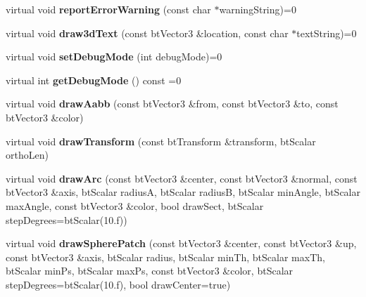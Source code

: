 \begin{DoxyCompactItemize}
\item 
\hypertarget{classbt_i_debug_draw_a4114a426d9d922d7b834673bb4044757}{virtual void {\bfseries report\+Error\+Warning} (const char $\ast$warning\+String)=0}\label{classbt_i_debug_draw_a4114a426d9d922d7b834673bb4044757}

\item 
\hypertarget{classbt_i_debug_draw_a287102dad359ae7c0685ec527c54ea48}{virtual void {\bfseries draw3d\+Text} (const bt\+Vector3 \&location, const char $\ast$text\+String)=0}\label{classbt_i_debug_draw_a287102dad359ae7c0685ec527c54ea48}

\item 
\hypertarget{classbt_i_debug_draw_a682fb01e96403d1da04207b7a9b46639}{virtual void {\bfseries set\+Debug\+Mode} (int debug\+Mode)=0}\label{classbt_i_debug_draw_a682fb01e96403d1da04207b7a9b46639}

\item 
\hypertarget{classbt_i_debug_draw_a8b0e36c47552ec81ea61a16f6239f92d}{virtual int {\bfseries get\+Debug\+Mode} () const =0}\label{classbt_i_debug_draw_a8b0e36c47552ec81ea61a16f6239f92d}

\item 
\hypertarget{classbt_i_debug_draw_ae60d3fc7f75c75712261d970dbd87fb9}{virtual void {\bfseries draw\+Aabb} (const bt\+Vector3 \&from, const bt\+Vector3 \&to, const bt\+Vector3 \&color)}\label{classbt_i_debug_draw_ae60d3fc7f75c75712261d970dbd87fb9}

\item 
\hypertarget{classbt_i_debug_draw_a6faa8214eebc450104325b6833448b1e}{virtual void {\bfseries draw\+Transform} (const bt\+Transform \&transform, bt\+Scalar ortho\+Len)}\label{classbt_i_debug_draw_a6faa8214eebc450104325b6833448b1e}

\item 
\hypertarget{classbt_i_debug_draw_a19cd036ce23c673c4ac13cc3f2a5ac33}{virtual void {\bfseries draw\+Arc} (const bt\+Vector3 \&center, const bt\+Vector3 \&normal, const bt\+Vector3 \&axis, bt\+Scalar radius\+A, bt\+Scalar radius\+B, bt\+Scalar min\+Angle, bt\+Scalar max\+Angle, const bt\+Vector3 \&color, bool draw\+Sect, bt\+Scalar step\+Degrees=bt\+Scalar(10.f))}\label{classbt_i_debug_draw_a19cd036ce23c673c4ac13cc3f2a5ac33}

\item 
\hypertarget{classbt_i_debug_draw_aaa3510d1efce41e4a98915ef542c4288}{virtual void {\bfseries draw\+Sphere\+Patch} (const bt\+Vector3 \&center, const bt\+Vector3 \&up, const bt\+Vector3 \&axis, bt\+Scalar radius, bt\+Scalar min\+Th, bt\+Scalar max\+Th, bt\+Scalar min\+Ps, bt\+Scalar max\+Ps, const bt\+Vector3 \&color, bt\+Scalar step\+Degrees=bt\+Scalar(10.f), bool draw\+Center=true)}\label{classbt_i_debug_draw_aaa3510d1efce41e4a98915ef542c4288}


\end{DoxyCompactItemize}
